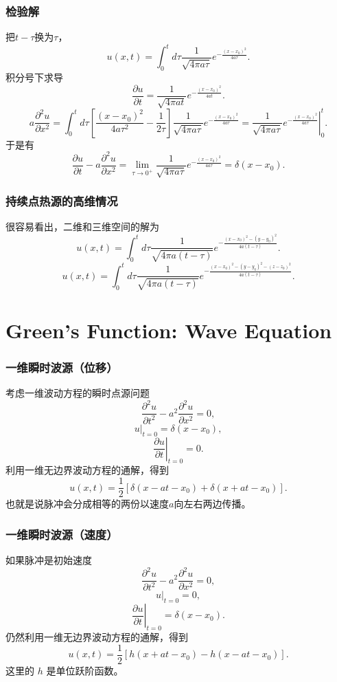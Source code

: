 \documentclass[CJK]{beamer}
\begin{document}
\begin{frame}
  \frametitle{检验解}
  把$t-\tau$换为$\tau$，
  $$ u(x,t) = \int_0^t d\tau  \frac{1}{\sqrt{4\pi a\tau}} e^{-\frac{(x-x_0)^2}{4a\tau}}.$$
  积分号下求导
  $$\frac{\partial u}{\partial t}= \frac{1}{\sqrt{4\pi at}} e^{-\frac{(x-x_0)^2}{4at}}.$$
  $$a\frac{\partial^2 u}{\partial x^2} = \int_0^t d\tau  \left[\frac{(x-x_0)^2}{4a\tau^2}-\frac{1}{2\tau} \right]\frac{1}{\sqrt{4\pi a\tau}} e^{-\frac{(x-x_0)^2}{4a\tau}} = \left.\frac{1}{\sqrt{4\pi a\tau}} e^{-\frac{(x-x_0)^2}{4a\tau}} \right\vert_0^t.$$
  于是有
  $$\frac{\partial u}{\partial t} - a\frac{\partial^2 u}{\partial x^2}= \lim_{\tau\rightarrow 0^+}\frac{1}{\sqrt{4\pi a\tau}} e^{-\frac{(x-x_0)^2}{4a\tau}} = \delta(x-x_0).$$
\end{frame}



\begin{frame}
  \frametitle{持续点热源的高维情况}
  很容易看出，二维和三维空间的解为
  $$ u(x,t) = \int_0^t d\tau  \frac{1}{\sqrt{4\pi a(t-\tau)}} e^{-\frac{(x-x_0)^2-(y-y_0)^2}{4a(t-\tau)}}.$$
  $$ u(x,t) = \int_0^t d\tau  \frac{1}{\sqrt{4\pi a(t-\tau)}} e^{-\frac{(x-x_0)^2-(y-y_0)^2-(z-z_0)^2}{4a(t-\tau)}}.$$
  
\end{frame}


\section{Green's Function: Wave Equation}

\begin{frame}
  \frametitle{一维瞬时波源（位移）}
  考虑一维波动方程的瞬时点源问题
  $$\frac{\partial^2u}{\partial t^2}-a^2\frac{\partial^2u }{\partial x^2} = 0, $$
  $$\left. u\right\vert_{t=0} = \delta(x-x_0),$$
  $$\left. \frac{\partial u}{\partial t}\right\vert_{t=0} = 0.$$  
  利用一维无边界波动方程的通解，得到
  $$ u(x,t) = \frac{1}{2}\left[\delta(x-at-x_0) + \delta(x+at-x_0)\right].$$
  也就是说脉冲会分成相等的两份以速度$a$向左右两边传播。
\end{frame}

\begin{frame}
  \frametitle{一维瞬时波源（速度）}
  如果脉冲是初始速度
  $$\frac{\partial^2u}{\partial t^2}-a^2\frac{\partial^2u }{\partial x^2} = 0, $$
  $$\left. u\right\vert_{t=0} = 0,$$
  $$\left. \frac{\partial u}{\partial t}\right\vert_{t=0} = \delta(x-x_0).$$  
  仍然利用一维无边界波动方程的通解，得到
  $$ u(x,t) = \frac{1}{2}\left[h(x+at-x_0) - h(x-at-x_0)\right].$$
  这里的 $h$ 是单位跃阶函数。


\end{frame}
\end{document}
